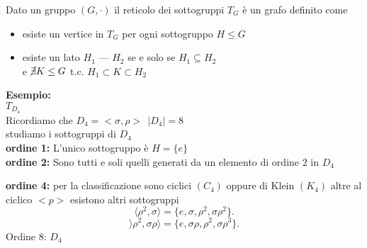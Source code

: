 \documentclass[12px]{article}
\begin{document}
	\begin{defi}
		Dato un gruppo $(G,\cdot)$ il reticolo dei sottogruppi $T_G$ è un grafo definito come\\
		\begin{itemize}
			\item esiste un vertice in $T_G$ per ogni sottogruppo $H\leq G$ \\
			\item esiste un lato $H_1$ \---- $H_2$ se e solo se $H_1\subseteq H_2$ \\e $\cancel\exists K\leq G$ t.c. $H_1\subset K\subset H_2$
		\end{itemize}
	\end{defi}
	\textbf{Esempio:}\\
	$T_{D_4}$\\
	Ricordiamo che $D_4 = <\sigma,\rho>  \ \ |D_4|=8$\\
	studiamo i sottogruppi di $D_4$\\
	\textbf{ordine 1:} L'unico sottogruppo è $H=\{e\}$\\
	 \textbf{ordine 2:} Sono tutti e soli quelli generati da un elemento di ordine $2$ in $D_4$
	 \begin{center}
	 \end{center}
	 \textbf{ordine 4:} per la classificazione sono ciclici $(C_4)$ oppure di Klein $(K_4)$ altre al ciclico $<p>$ esistono altri sottogruppi\\
	 \[
		 \langle \rho^2,\sigma\rangle = \{e, \sigma,\rho^2,\sigma\rho^2\}
	 .\] 
	 \[
		 \rangle\rho^2, \sigma\rho\rangle = \{e,\sigma\rho, \rho^2,\sigma\rho^3\}
	 .\]
	 Ordine 8: $D_4$\\
\end{document}
